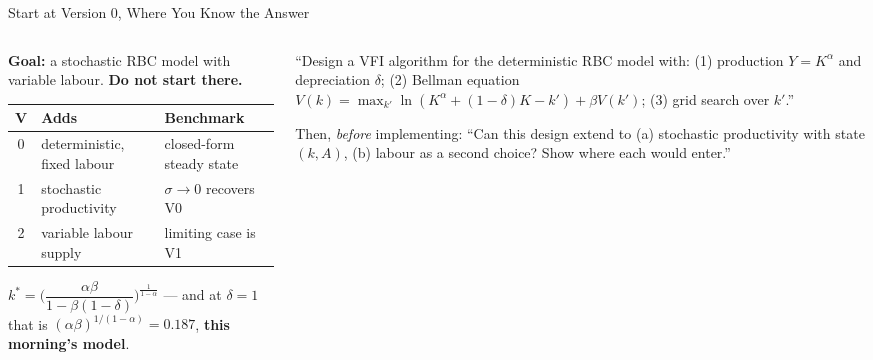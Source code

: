 \begin{frame}{Start at Version 0, Where You Know the Answer}
\begin{columns}[T]
\begin{column}{0.49\textwidth}
\small
\textbf{Goal:} a stochastic RBC model with variable labour. \textbf{Do not start there.}
\medskip
\begin{center}\footnotesize
\begin{tabularx}{\linewidth}{@{}c >{\raggedright\arraybackslash}X >{\raggedright\arraybackslash}p{2.2cm}@{}}
\toprule
\textbf{V} & \textbf{Adds} & \textbf{Benchmark} \\
\midrule
0 & deterministic, fixed labour & closed-form steady state \\
1 & stochastic productivity & $\sigma\!\to\!0$ recovers V0 \\
2 & variable labour supply & limiting case is V1 \\
\bottomrule
\end{tabularx}
\end{center}
\medskip
\footnotesize
$k^{*}=\Big(\dfrac{\alpha\beta}{1-\beta(1-\delta)}\Big)^{\frac{1}{1-\alpha}}$ --- and at $\delta=1$ that is $(\alpha\beta)^{1/(1-\alpha)}=0.187$, \textbf{this morning's model}.
\end{column}
\begin{column}{0.48\textwidth}
\begin{conceptbox}[title=\textbf{Step 1: design, before any code}]\footnotesize
``Design a VFI algorithm for the deterministic RBC model with: (1) production $Y=K^{\alpha}$ and depreciation $\delta$; (2) Bellman equation $V(k)=\max_{k'}\ln(K^{\alpha}+(1-\delta)K-k')+\beta V(k')$; (3) grid search over $k'$.''
\end{conceptbox}
\vspace{-1mm}
\begin{examplebox}\footnotesize
Then, \emph{before} implementing: ``Can this design extend to (a) stochastic productivity with state $(k,A)$, (b) labour as a second choice? Show where each would enter.''
\end{examplebox}
\end{column}
\end{columns}
\vspace{1mm}
\end{frame}

